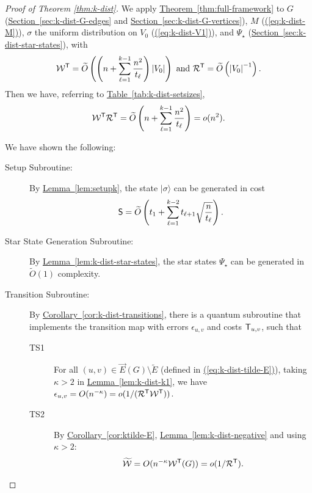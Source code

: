\documentclass{article}
\newcommand{\eq}[1]{\hyperref[eq:#1]{(\ref*{eq:#1})}}
\renewcommand{\sec}[1]{\hyperref[sec:#1]{Section~\ref*{sec:#1}}}
\newcommand{\thm}[1]{\hyperref[thm:#1]{Theorem~\ref*{thm:#1}}}
\newcommand{\lem}[1]{\hyperref[lem:#1]{Lemma~\ref*{lem:#1}}}
\newcommand{\cor}[1]{\hyperref[cor:#1]{Corollary~\ref*{cor:#1}}}
\newcommand{\tabl}[1]{\hyperref[tab:#1]{Table~\ref*{tab:#1}}}
\def\ket#1{{\lvert}#1\rangle}
\renewcommand{\>}{\rangle}
\newcommand{\<}{\langle}
\renewcommand{\(}{\left(}
\renewcommand{\)}{\right)}
\def\abs#1{\left| #1 \right|}
\begin{document}
\begin{proof}[Proof of Theorem \ref{thm:k-dist}]
	We apply \thm{full-framework} to $G$ (\sec{k-dist-G-edges} and \sec{k-dist-G-vertices}), $M$ (\eq{k-dist-M}),  $\sigma$ the uniform distribution on $V_0$ (\eq{k-dist-V1}), and $\Psi_\star$ (\sec{k-dist-star-states}), with 
	$${\cal W}^{\sf T}=\widetilde{O}\left(\left(n  + \sum_{\ell=1}^{k-1} \frac{n^2}{t_{\ell}}\right)\abs{V_0}\right)
	\mbox{ and }
	{\cal R}^{\sf T}=\widetilde{O}\left(\abs{V_0}^{-1} \right).$$
	Then we have, referring to \tabl{k-dist-setsizes},
	$${\cal W}^{\sf T}{\cal R}^{\sf T} = \widetilde{O}\left(n  + \sum_{\ell=1}^{k-1} \frac{n^2}{t_{\ell}}\right)=o(n^2).$$
	
	\noindent We have shown the following:
	\begin{description}
		\item[Setup Subroutine:] By \lem{setupk}, the state $\ket{\sigma}$ can be generated in cost 
		$${\sf S}=\widetilde{O}\left(t_1+\sum_{\ell=1}^{k-2}t_{\ell+1}\sqrt{\frac{n}{t_{\ell}}}\right).$$
		\item[Star State Generation Subroutine:] By \lem{k-dist-star-states}, the star states ${\Psi_\star}$ can be generated in $\widetilde{O}(1)$ complexity.
		\item[Transition Subroutine:] By \cor{k-dist-transitions}, there is a quantum subroutine that implements the transition map with errors $\epsilon_{u,v}$ and costs ${\sf T}_{u,v}$, such that
		\begin{description}
			\item[TS1] For all $(u,v)\in \overrightarrow{E}(G)\setminus \tilde{E}$ (defined in \eq{k-dist-tilde-E}), taking $\kappa>2$ in \lem{k-dist-k1}, we have $\epsilon_{u,v}
			=O(n^{-\kappa})=o(1/({\cal R}^{\sf T}{\cal W}^{\sf T}))$.
			\item[TS2] By \cor{ktilde-E}, \lem{k-dist-negative} and using $\kappa > 2$:
			\begin{align*}
				\widetilde{\cal W} = O(n^{-\kappa}{\cal W}^{\sf T}(G)) = o(1/{\cal R}^{\sf T}).
			\end{align*}
			
		\end{description}
		

\end{description}
\end{proof}
\end{document}
